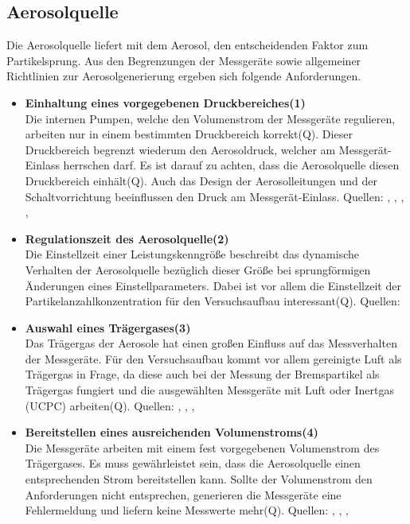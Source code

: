 \subsection{Aerosolquelle}
Die Aerosolquelle liefert mit dem Aerosol, den entscheidenden Faktor zum Partikelsprung. Aus den Begrenzungen der Messger\"{a}te sowie allgemeiner Richtlinien zur Aerosolgenerierung ergeben sich folgende Anforderungen.

\begin{itemize}
\item \textbf{Einhaltung eines vorgegebenen Druckbereiches(1)}\\
Die internen Pumpen, welche den Volumenstrom der Messger\"{a}te regulieren, arbeiten nur in einem bestimmten Druckbereich korrekt(Q). Dieser Druckbereich begrenzt wiederum den Aerosoldruck, welcher am Messger\"{a}t-Einlass herrschen darf. Es ist darauf zu achten, dass die Aerosolquelle diesen Druckbereich einh\"{a}lt(Q). 
Auch das Design der Aerosolleitungen und der Schaltvorrichtung beeinflussen den Druck am Messger\"{a}t-Einlass. 
Quellen: \cite{fmps_3091}, \cite{ops_3330}, \cite{aps_3321}, \cite{ucpc_3776}, \cite{tsl_skript}

\item \textbf{Regulationszeit des Aerosolquelle(2)}\\
Die Einstellzeit einer Leistungskenngr\"{o}{\ss}e beschreibt das dynamische Verhalten der Aerosolquelle bez\"{u}glich dieser Gr\"{o}{\ss}e bei sprungf\"{o}rmigen \"{A}nderungen eines Einstellparameters. Dabei ist vor allem die Einstellzeit der Partikelanzahlkonzentration f\"{u}r den Versuchsaufbau interessant(Q). 
Quellen: \cite{vdi3491}

\item \textbf{Auswahl eines Tr\"{a}gergases(3)}\\
Das Tr\"{a}gergas der Aerosole hat einen gro{\ss}en Einfluss auf das Messverhalten der Messger\"{a}te.  F\"{u}r den Versuchsaufbau kommt vor allem gereinigte Luft als Tr\"{a}gergas in Frage, da diese auch bei der Messung der Bremspartikel als Tr\"{a}gergas fungiert und die ausgew\"{a}hlten Messger\"{a}te mit Luft oder Inertgas (UCPC) arbeiten(Q). 
Quellen: \cite{fmps_3091}, \cite{ops_3330}, \cite{aps_3321}, \cite{ucpc_3776}

\item \textbf{Bereitstellen eines ausreichenden Volumenstroms(4)}\\
Die Messger\"{a}te arbeiten mit einem fest vorgegebenen Volumenstrom des Tr\"{a}gergases.  Es muss gew\"{a}hrleistet sein, dass die Aerosolquelle einen entsprechenden Strom bereitstellen kann. Sollte der Volumenstrom den Anforderungen nicht entsprechen, generieren die Messger\"{a}te eine Fehlermeldung und liefern keine Messwerte mehr(Q). 
Quellen: \cite{fmps_3091}, \cite{ops_3330}, \cite{aps_3321}, \cite{ucpc_3776}


\end{itemize}
